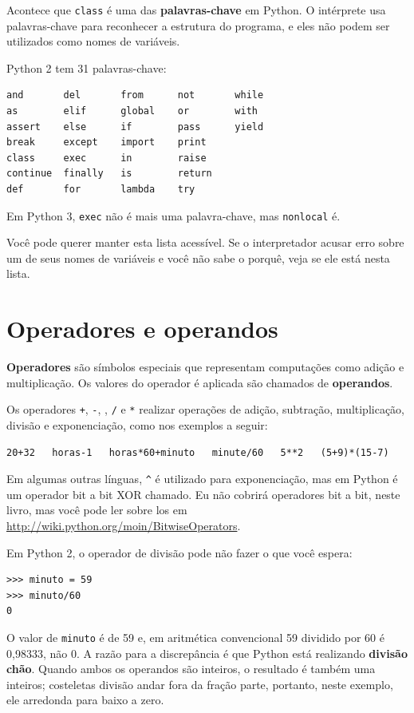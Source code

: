 \documentclass[10pt]{book}
\begin{document}
Acontece que {\tt class} é uma das {\bf palavras-chave} em Python. O
intérprete usa palavras-chave para reconhecer a estrutura do programa,
e eles não podem ser utilizados como nomes de variáveis.

Python 2 tem 31 palavras-chave:

\begin{verbatim}
and       del       from      not       while    
as        elif      global    or        with     
assert    else      if        pass      yield    
break     except    import    print              
class     exec      in        raise              
continue  finally   is        return             
def       for       lambda    try
\end{verbatim}
%
Em Python 3, {\tt exec} não é mais uma palavra-chave, mas {\tt nonlocal} é.

Você pode querer manter esta lista acessível. Se o interpretador acusar erro
sobre um de seus nomes de variáveis ​​e você não sabe o porquê, veja se ele
está nesta lista.


\section{Operadores e operandos}

{\bf Operadores} são símbolos especiais que representam computações como
adição e multiplicação. Os valores do operador é aplicada
são chamados de {\bf operandos}.

Os operadores {\tt +}, {\tt -}, {\tt *}, {\tt /} e {\tt **}
realizar operações de adição, subtração, multiplicação, divisão e
exponenciação, como nos exemplos a seguir:

\begin{verbatim}
20+32   horas-1   horas*60+minuto   minute/60   5**2   (5+9)*(15-7)
\end{verbatim}
%
Em algumas outras línguas, \verb"^" é utilizado para exponenciação, mas
em Python é um operador bit a bit XOR chamado. Eu não cobrirá
operadores bit a bit, neste livro, mas você pode ler sobre
los em \url{http://wiki.python.org/moin/BitwiseOperators}.

Em Python 2, o operador de divisão pode não fazer o que você espera:

\begin{verbatim}
>>> minuto = 59
>>> minuto/60
0
\end{verbatim}
%
O valor de {\tt minuto} é de 59 e, em aritmética convencional 59
dividido por 60 é 0,98333, não 0. A razão para a discrepância é
que Python está realizando {\bf divisão chão}.
Quando ambos os operandos são inteiros, o resultado é também uma
inteiros; costeletas divisão andar fora da fração
parte, portanto, neste exemplo, ele arredonda para baixo a zero.
\end{document}
